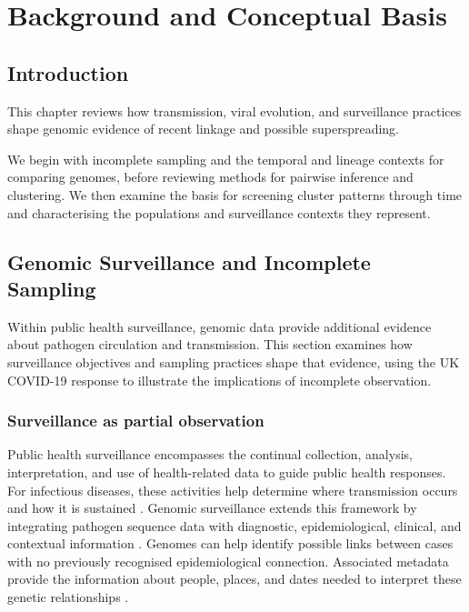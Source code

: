 \chapter{Background and Conceptual Basis}\label{ch:literature}

\section{Introduction}\label{sec:ch2_introduction}

This chapter reviews how transmission, viral evolution, and surveillance practices shape genomic evidence of recent linkage and possible superspreading.

We begin with incomplete sampling and the temporal and lineage contexts for comparing genomes, before reviewing methods for pairwise inference and clustering. We then examine the basis for screening cluster patterns through time and characterising the populations and surveillance contexts they represent.

\section{Genomic Surveillance and Incomplete Sampling}\label{sec:ch2_partial_observation}

Within public health surveillance, genomic data provide additional evidence about pathogen circulation and transmission. This section examines how surveillance objectives and sampling practices shape that evidence, using the UK COVID-19 response to illustrate the implications of incomplete observation.

\subsection{Surveillance as partial observation}\label{sec:ch2_partial_obs_concept}

Public health surveillance encompasses the continual collection, analysis, interpretation, and use of health-related data to guide public health responses. For infectious diseases, these activities help determine where transmission occurs and how it is sustained \citep{Murray2017,Groseclose2017}. Genomic surveillance extends this framework by integrating pathogen sequence data with diagnostic, epidemiological, clinical, and contextual information \citep{WHO2023,Tiwari2025,ECDC2014,Black2020}. Genomes can help identify possible links between cases with no previously recognised epidemiological connection. Associated metadata provide the information about people, places, and dates needed to interpret these genetic relationships \citep{Gardy2017,Armstrong2019,Carter2022}.

